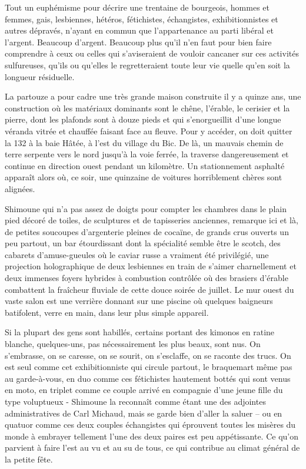 Tout un euphémisme pour décrire une trentaine de bourgeois, hommes et femmes, gais, lesbiennes, hétéros, fétichistes, échangistes, exhibitionnistes et autres dépravés, n’ayant en commun que l’appartenance au parti libéral et l’argent. Beaucoup d’argent. Beaucoup plus qu’il n’en faut pour bien faire comprendre à ceux ou celles qui s’aviseraient de vouloir cancaner sur ces activités sulfureuses, qu’ils ou qu’elles le regretteraient toute leur vie quelle qu’en soit la longueur résiduelle.

La partouze a pour cadre une très grande maison construite il y a quinze ans, une construction où les matériaux dominants sont le chêne, l’érable, le cerisier et la pierre, dont les plafonds sont à douze pieds et qui s’enorgueillit d’une longue véranda vitrée et chauffée faisant face au fleuve. Pour y accéder, on doit quitter la 132 à la baie Hâtée, à l’est du village du Bic. De là, un mauvais chemin de terre serpente vers le nord jusqu’à la voie ferrée, la traverse dangereusement et continue en direction ouest pendant un kilomètre. Un stationnement asphalté apparaît alors où, ce soir, une quinzaine de voitures horriblement chères sont alignées.

Shimoune qui n’a pas assez de doigts pour compter les chambres dans le plain pied décoré de toiles, de sculptures et de tapisseries anciennes, remarque ici et là, de petites soucoupes d’argenterie pleines de cocaïne, de grands crus ouverts un peu partout, un bar étourdissant dont la spécialité semble être le scotch, des cabarets d’amuse-gueules où le caviar russe a vraiment été privilégié, une projection holographique de deux lesbiennes en train de s’aimer charnellement et deux immenses foyers hybrides à combustion contrôlée où des brasiers d’érable combattent la fraîcheur fluviale de cette douce soirée de juillet. Le mur ouest du vaste salon est une verrière donnant sur une piscine où quelques baigneurs batifolent, verre en main, dans leur plus simple appareil.

Si la plupart des gens sont habillés, certains portant des kimonos en ratine blanche, quelques-uns, pas nécessairement les plus beaux, sont nus. On s’embrasse, on se caresse, on se sourit, on s’esclaffe, on se raconte des trucs. On est seul comme cet exhibitionniste qui circule partout, le braquemart même pas au garde-à-vous, en duo comme ces fétichistes hautement bottés qui sont venus en moto, en triplet comme ce couple arrivé en compagnie d’une jeune fille du type voluptueux - Shimoune la reconnaît comme étant une des adjointes administratives de Carl Michaud, mais se garde bien d’aller la saluer – ou en quatuor comme ces deux couples échangistes qui éprouvent toutes les misères du monde à embrayer tellement l’une des deux paires est peu appétissante. Ce qu’on parvient à faire l’est au vu et au su de tous, ce qui contribue au climat général de la petite fête.

